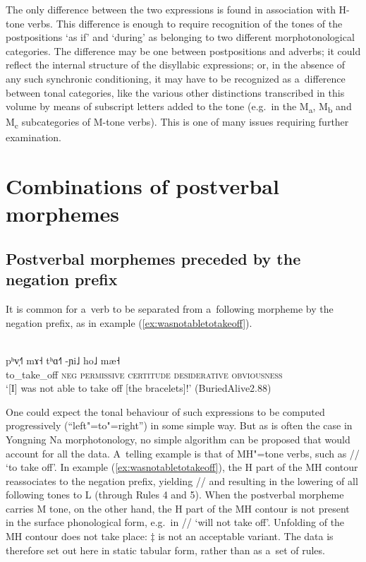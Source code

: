 The only difference between the two expressions is found in association with H-tone verbs. This
difference is enough to require recognition of the tones of the postpositions  ‘as if’ and  ‘during’ as belonging to two different morphotonological categories. The difference may be one between postpositions and adverbs; it could reflect the internal structure of the disyllabic expressions; or, in the absence of any such synchronic conditioning, it may have to be recognized as a~difference between tonal categories, like the various other distinctions transcribed in this volume by means of subscript letters added to the tone (e.g.~in the M\textsubscript{a}, M\textsubscript{b} and M\textsubscript{c} subcategories of M-tone verbs). This is one of many issues requiring further examination.


\section{Combinations of postverbal morphemes}
\label{sec:combinationsbetweenaffixes}

\subsection{Postverbal morphemes preceded by the {negation} prefix}
\label{sec:suffixesprecededbythenegation}

It is common for a~verb to be separated from a~following morpheme by the {negation} prefix, as
in example (\ref{ex:wasnotabletotakeoff}).
\begin{exe}
  \ex
  \label{ex:wasnotabletotakeoff}
  \\
  \gll pʰv̩˧˥	mɤ˧	tʰɑ˧˥	-ɲi˩	ho˩	mæ˧\\
  to\_take\_off	\textsc{neg}	\textsc{permissive}	\textsc{certitude}	\textsc{desiderative}
  \textsc{obviousness}\\
  \glt ‘[I] was not able to take off [the bracelets]!' (BuriedAlive2.88)
\end{exe}

One could expect the tonal behaviour of such expressions to be computed progressively
(“left"=to"=right”) in some simple way. But as is often the case in Yongning Na morphotonology, no simple algorithm can be
proposed that would account for all the data. A~telling example is that of MH"=tone verbs, such as
// ‘to take off’. In example (\ref{ex:wasnotabletotakeoff}), the H part of the MH contour reassociates to the
{negation} prefix, yielding // and resulting in the lowering of all following tones to
L (through Rules 4 and 5). When the postverbal morpheme carries M tone, on the other hand, the H part of the MH
contour is not present in the surface phonological form, e.g.~in // ‘will
not take off’. Unfolding of the MH contour does not take place: $\ddagger${\kern2pt} is not an acceptable variant. The data is therefore set out here in static tabular form, rather than as a~set of rules.



